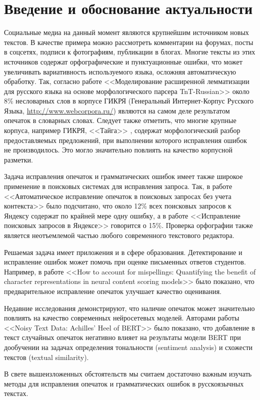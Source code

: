 \chapter{Введение и обоснование актуальности}

Социальные медиа на данный момент являются крупнейшим источником новых текстов. В качестве примера можно рассмотреть комментарии на форумах, посты в соцсетях, подписи к фотографиям, публикации в блогах.
Многие тексты из этих источников содержат орфографические и пунктуационные ошибки, что может увеличивать вариативность используемого языка, осложняя автоматическую обработку. Так, согласно работе <<Моделирование расширенной лемматизации для русского языка на основе морфологического парсера TnT-Russian>>\cite{Shavrina2015} около 8\% несловарных слов в корпусе ГИКРЯ (Генеральный Интернет-Корпус Русского Языка, \url{http://www.webcorpora.ru/}) являются на самом деле результатом опечаток в словарных словах. Следует также отметить, что многие крупные корпуса, например ГИКРЯ, <<Тайга>> \cite{Shavrina2017}, содержат морфологический разбор предоставляемых предложений, при выполнении которого исправления ошибок не производилось. Это могло значительно повлиять на качество корпусной разметки.

Задача исправления опечаток и грамматических ошибок имеет также широкое применение в поисковых системах для исправления запроса. Так, в работе <<Автоматическое исправление опечаток в поисковых запросах без учета контекста>>\cite{Panina2013} было подсчитано, что около 12\% всех поисковых запросов к Яндексу содержат по крайней мере одну ошибку, а в работе <<Исправление поисковых запросов в Яндексе>> \cite{Bajtin2008} говорится о 15\%. Проверка орфографии также является неотъемлемой частью любого современного текстового редактора.

Решаемая задача имеет приложения и в сфере образования. Детектирование и исправление ошибок может помочь при оценке письменных ответов студентов. Например, в работе <<How to account for mispellings: Quantifying the benefit of character representations in neural content scoring models>> \cite{Riordan2019} было показано, что предварительное исправление опечаток улучшает качество оценивания.

Недавние исследования демонстрируют, что наличие опечаток может значительно повлиять на качество современных нейросетевых моделей. Авторами работы <<Noisy Text Data: Achilles’ Heel of BERT>> \cite{Kumar2020} было показано, что добавление в текст случайных опечаток негативно влияет на результаты модели BERT \cite{Devlin2019} при дообучении на задачах определения тональности (sentiment analysis) и схожести текстов (textual similarity).  

В свете вышеизложенных обстоятельств мы считаем достаточно важным изучать методы для исправления опечаток и грамматических ошибок в русскоязычных текстах.
